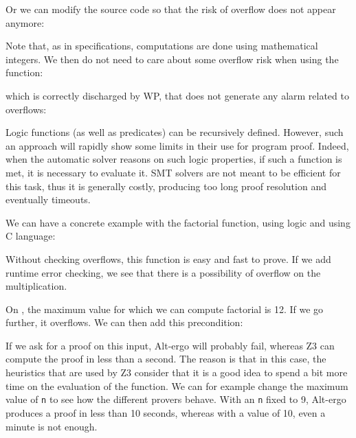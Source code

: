 

Or we can modify the source code so that the risk of overflow does not
appear anymore:




Note that, as in specifications, computations are done using mathematical
integers. We then do not need to care about some overflow risk when using
the  function:




which is correctly discharged by WP, that does not generate any alarm
related to overflows:






Logic functions (as well as predicates) can be recursively defined.
However, such an approach will rapidly show some limits in their use for
program proof. Indeed, when the automatic solver reasons on such logic
properties, if such a function is met, it is necessary to evaluate it.
SMT solvers are not meant to be efficient for this task, thus it is generally
costly, producing too long proof resolution and eventually timeouts.

We can have a concrete example with the factorial function, using logic
and using C language:






Without checking overflows, this function is easy and fast to prove. If
we add runtime error checking, we see that there is a possibility of
overflow on the multiplication.



On , the maximum value for which we can compute
factorial is 12. If we go further, it overflows. We can then add this
precondition:






If we ask for a proof on this input, Alt-ergo will probably fail,
whereas Z3 can compute the proof in less than a second. The reason is
that in this case, the heuristics that are used by Z3 consider that it
is a good idea to spend a bit more time on the evaluation of the
function. We can for example change the maximum value of \texttt{n} to
see how the different provers behave. With an \texttt{n} fixed to 9,
Alt-ergo produces a proof in less than 10 seconds, whereas with a value
of 10, even a minute is not enough.



